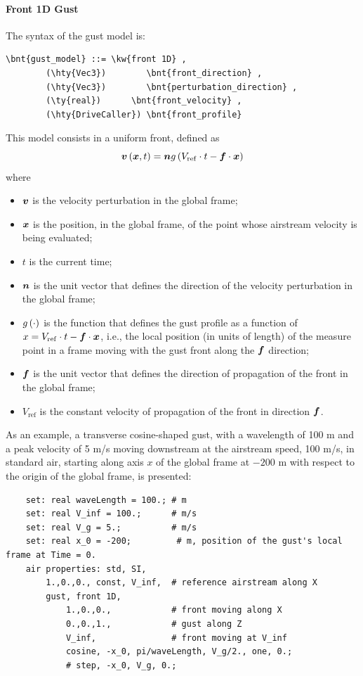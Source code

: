 \paragraph{Front 1D Gust}
The syntax of the  gust model is:
\begin{Verbatim}[commandchars=\\\{\}]
    \bnt{gust_model} ::= \kw{front 1D} ,
        (\hty{Vec3})        \bnt{front_direction} ,
        (\hty{Vec3})        \bnt{perturbation_direction} ,
        (\ty{real})      \bnt{front_velocity} ,
        (\hty{DriveCaller}) \bnt{front_profile}
\end{Verbatim}
This model consists in a uniform front, defined as
\begin{displaymath}
	\boldsymbol{v}\left( \boldsymbol{x}, t \right) = \boldsymbol{n} g\left( V_\mathrm{ref} \cdot t - \boldsymbol{f} \cdot \boldsymbol{x} \right)
\end{displaymath}
where
\begin{itemize}
\item $\boldsymbol{v}$ is the velocity perturbation in the global frame;
\item $\boldsymbol{x}$ is the position, in the global frame, of the point whose airstream velocity
is being evaluated;
\item $t$ is the current time;
\item $\boldsymbol{n}$ is the unit vector 
that defines the direction of the velocity perturbation in the global frame;
\item $g\left( \cdot \right)$ is the function 
that defines the gust profile as a function of $x = V_\mathrm{ref} \cdot t - \boldsymbol{f} \cdot \boldsymbol{x}$, i.e., the local position (in units of length) of the measure point in a frame moving with the gust front along the $\boldsymbol{f}$ direction;
\item $\boldsymbol{f}$ is the unit vector 
that defines the direction of propagation of the front in the global frame;
\item $V_\mathrm{ref}$ is the constant velocity 
of propagation of the front in direction $\boldsymbol{f}$.
\end{itemize}
As an example, a transverse cosine-shaped gust, with a wavelength of 100 m
and a peak velocity of 5 m/s moving downstream at the airstream speed,
100 m/s, in standard air, starting along axis $x$ of the global frame at $-200$ m with respect to the origin of the global frame, is presented:
\begin{verbatim}
    set: real waveLength = 100.; # m
    set: real V_inf = 100.;      # m/s
    set: real V_g = 5.;          # m/s
    set: real x_0 = -200;         # m, position of the gust's local frame at Time = 0.
    air properties: std, SI,
        1.,0.,0., const, V_inf,  # reference airstream along X
        gust, front 1D,
            1.,0.,0.,            # front moving along X
            0.,0.,1.,            # gust along Z
            V_inf,               # front moving at V_inf
            cosine, -x_0, pi/waveLength, V_g/2., one, 0.;
            # step, -x_0, V_g, 0.;
\end{verbatim}
